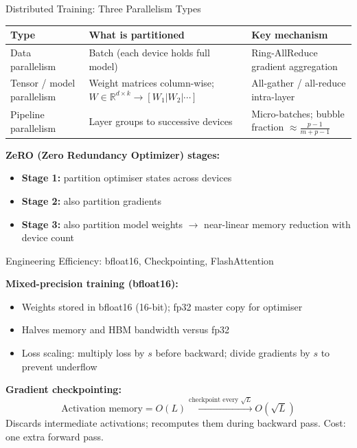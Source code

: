 \documentclass[9pt,t]{beamer}
\begin{document}
\begin{frame}[noframenumbering]{Distributed Training: Three Parallelism Types}

\begin{center}
\begin{tabular}{p{2.6cm}p{4.0cm}p{3.0cm}}
\toprule
\textbf{Type} & \textbf{What is partitioned} & \textbf{Key mechanism} \\
\midrule
Data parallelism &
  Batch (each device holds full model) &
  Ring-AllReduce gradient aggregation \\[4pt]
Tensor / model parallelism &
  Weight matrices column-wise; $W \in \mathbb{R}^{d\times k} \to [W_1|W_2|\cdots]$ &
  All-gather / all-reduce intra-layer \\[4pt]
Pipeline parallelism &
  Layer groups to successive devices &
  Micro-batches; bubble fraction $\approx \frac{p-1}{m+p-1}$ \\
\bottomrule
\end{tabular}
\end{center}

\medskip
\textbf{ZeRO (Zero Redundancy Optimizer) stages:}
\begin{itemize}
  \item \textbf{Stage 1:} partition optimiser states across devices
  \item \textbf{Stage 2:} also partition gradients
  \item \textbf{Stage 3:} also partition model weights $\rightarrow$ near-linear
        memory reduction with device count
\end{itemize}
\end{frame}

\begin{frame}[noframenumbering]{Engineering Efficiency: bfloat16, Checkpointing, FlashAttention}

\textbf{Mixed-precision training (bfloat16):}
\begin{itemize}
  \item Weights stored in bfloat16 (16-bit); fp32 master copy for optimiser
  \item Halves memory and HBM bandwidth versus fp32
  \item Loss scaling: multiply loss by $s$ before backward; divide gradients by $s$
        to prevent underflow
\end{itemize}

\medskip
\textbf{Gradient checkpointing:}
\[
  \text{Activation memory} = O(L) \xrightarrow{\text{checkpoint every } \sqrt{L}} O(\sqrt{L})
\]
Discards intermediate activations; recomputes them during backward pass.
Cost: one extra forward pass.
\end{frame}
\end{document}
